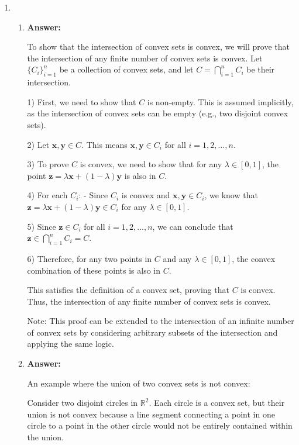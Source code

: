 \documentclass{article}
\newenvironment{answer}
    {\par\noindent\textbf{Answer:}\par}
    {\par}
\begin{document}
\begin{enumerate}
    \item 
    \begin{enumerate}
        \item 
        \begin{answer}
        To show that the intersection of convex sets is convex, we will prove that the intersection of any finite number of convex sets is convex. Let $\{C_i\}_{i=1}^n$ be a collection of convex sets, and let $C = \bigcap_{i=1}^n C_i$ be their intersection.

        1) First, we need to show that $C$ is non-empty. This is assumed implicitly, as the intersection of convex sets can be empty (e.g., two disjoint convex sets).

        2) Let $\mathbf{x}, \mathbf{y} \in C$. This means $\mathbf{x}, \mathbf{y} \in C_i$ for all $i = 1, 2, ..., n$.

        3) To prove $C$ is convex, we need to show that for any $\lambda \in [0,1]$, the point $\mathbf{z} = \lambda\mathbf{x} + (1-\lambda)\mathbf{y}$ is also in $C$.

        4) For each $C_i$:
           - Since $C_i$ is convex and $\mathbf{x}, \mathbf{y} \in C_i$, we know that $\mathbf{z} = \lambda\mathbf{x} + (1-\lambda)\mathbf{y} \in C_i$ for any $\lambda \in [0,1]$.

        5) Since $\mathbf{z} \in C_i$ for all $i = 1, 2, ..., n$, we can conclude that $\mathbf{z} \in \bigcap_{i=1}^n C_i = C$.

        6) Therefore, for any two points in $C$ and any $\lambda \in [0,1]$, the convex combination of these points is also in $C$.

        This satisfies the definition of a convex set, proving that $C$ is convex. Thus, the intersection of any finite number of convex sets is convex.

        Note: This proof can be extended to the intersection of an infinite number of convex sets by considering arbitrary subsets of the intersection and applying the same logic.
        \end{answer}

        \item 
        \begin{answer}
        An example where the union of two convex sets is not convex:
        
        Consider two disjoint circles in $\mathbb{R}^2$. Each circle is a convex set, but their union is not convex because a line segment connecting a point in one circle to a point in the other circle would not be entirely contained within the union.
        

\end{answer}
\end{enumerate}
\end{enumerate}
\end{document}
